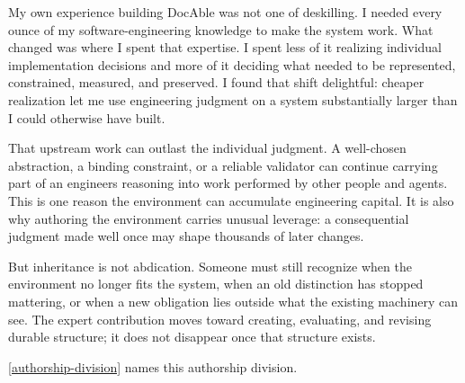 My own experience building DocAble was not one of deskilling. I needed every ounce of my software-engineering knowledge to make the system work. What changed was where I spent that expertise. I spent less of it realizing individual implementation decisions and more of it deciding what needed to be represented, constrained, measured, and preserved. I found that shift delightful: cheaper realization let me use engineering judgment on a system substantially larger than I could otherwise have built.


That upstream work can outlast the individual judgment. A well-chosen abstraction, a binding constraint, or a reliable validator can continue carrying part of an engineer\textquotesingle s reasoning into work performed by other people and agents. This is one reason the environment can accumulate engineering capital. It is also why authoring the environment carries unusual leverage: a consequential judgment made well once may shape thousands of later changes.


But inheritance is not abdication. Someone must still recognize when the environment no longer fits the system, when an old distinction has stopped mattering, or when a new obligation lies outside what the existing machinery can see. The expert contribution moves toward creating, evaluating, and revising durable structure; it does not disappear once that structure exists.

\autoref{authorship-division} names this authorship division.

